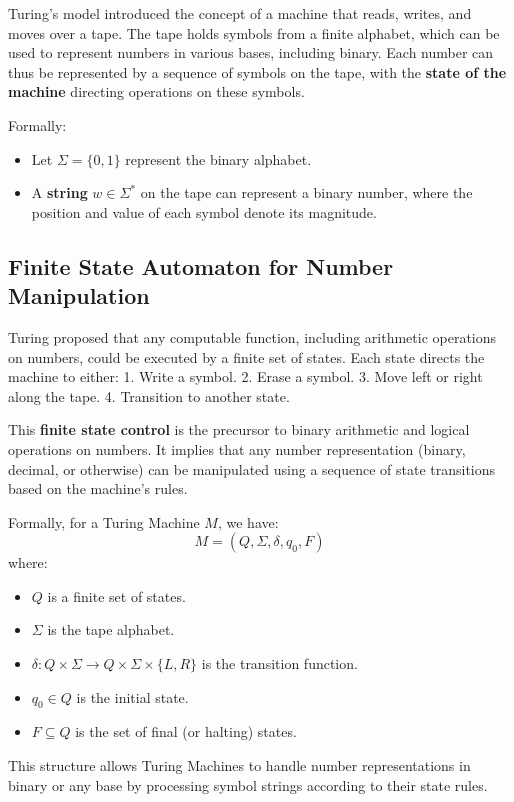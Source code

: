 Turing’s model introduced the concept of a machine that reads, writes, and moves over a tape. The tape holds symbols from a finite alphabet, which can be used to represent numbers in various bases, including binary. Each number can thus be represented by a sequence of symbols on the tape, with the \textbf{state of the machine} directing operations on these symbols.

Formally:
\begin{itemize}
    \item Let \( \Sigma = \{0, 1\} \) represent the binary alphabet.
    \item A \textbf{string} \( w \in \Sigma^* \) on the tape can represent a binary number, where the position and value of each symbol denote its magnitude.
\end{itemize}

\subsection{Finite State Automaton for Number Manipulation}

Turing proposed that any computable function, including arithmetic operations on numbers, could be executed by a finite set of states. Each state directs the machine to either:
1. Write a symbol.
2. Erase a symbol.
3. Move left or right along the tape.
4. Transition to another state.

This \textbf{finite state control} is the precursor to binary arithmetic and logical operations on numbers. It implies that any number representation (binary, decimal, or otherwise) can be manipulated using a sequence of state transitions based on the machine's rules.

Formally, for a Turing Machine \( M \), we have:
\[
M = (Q, \Sigma, \delta, q_0, F)
\]
where:
\begin{itemize}
    \item \( Q \) is a finite set of states.
    \item \( \Sigma \) is the tape alphabet.
    \item \( \delta: Q \times \Sigma \to Q \times \Sigma \times \{L, R\} \) is the transition function.
    \item \( q_0 \in Q \) is the initial state.
    \item \( F \subseteq Q \) is the set of final (or halting) states.
\end{itemize}

This structure allows Turing Machines to handle number representations in binary or any base by processing symbol strings according to their state rules.

